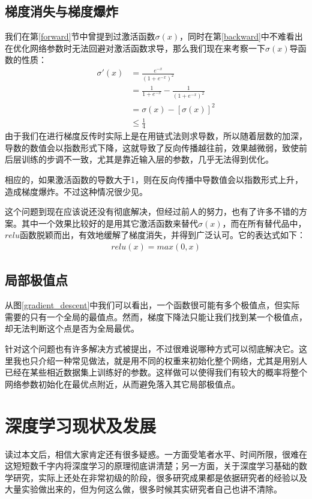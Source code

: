 \documentclass[UTF8,a4paper]{ctexart}
\begin{document}
\begin{multicols}{2}
		\subsection{梯度消失与梯度爆炸}
		\indent 我们在第\ref{forward}节中曾提到过激活函数$\sigma(x)$，同时在第\ref{backward}中不难看出在优化网络参数时无法回避对激活函数求导，那么我们现在来考察一下$\sigma(x)$导函数的性质：	
		\begin{equation}
		\begin{split}
		\sigma'(x) &= \frac{e^{-x}}{(1+e^{-x})^2} \\
		&= \frac{1}{1+e^{-x}} - \frac{1}{(1+e^{-x})^2} \\
		&= \sigma(x) - [\sigma(x)]^2 \\
		&\leq \frac{1}{4}
		\end{split} 
		\end{equation}		
		\indent 由于我们在进行梯度反传时实际上是在用链式法则求导数，所以随着层数的加深，导数的数值会以指数形式下降，这就导致了反向传播越往前，效果越微弱，致使前后层训练的步调不一致，尤其是靠近输入层的参数，几乎无法得到优化。
		
		\indent 相应的，如果激活函数的导数大于1，则在反向传播中导数值会以指数形式上升，造成梯度爆炸。不过这种情况很少见。
		
		\indent 这个问题到现在应该说还没有彻底解决，但经过前人的努力，也有了许多不错的方案。其中一个效果比较好的是用其它激活函数来替代$\sigma(x)$，而在所有替代品中，$relu$函数脱颖而出，有效地缓解了梯度消失，并得到广泛认可。它的表达式如下：	
		\begin{equation}
			\begin{split}
				relu(x) = max(0, x)
			\end{split}	
		\end{equation}
		
		\subsection{局部极值点}
		\indent 从图\ref{gradient_descent}中我们可以看出，一个函数很可能有多个极值点，但实际需要的只有一个全局的最值点。然而，梯度下降法只能让我们找到某一个极值点，却无法判断这个点是否为全局最优。
		
		\indent 针对这个问题也有许多解决方式被提出，不过很难说哪种方式可以彻底解决它。这里我也只介绍一种常见做法，就是用不同的权重来初始化整个网络，尤其是用别人已经在某些相近数据集上训练好的参数。这样做可以使得我们有较大的概率将整个网络参数初始化在最优点附近，从而避免落入其它局部极值点。
		
		
		\section{深度学习现状及发展}
		\indent 读过本文后，相信大家肯定还有很多疑惑。一方面受笔者水平、时间所限，很难在这短短数千字内将深度学习的原理彻底讲清楚；另一方面，关于深度学习基础的数学研究，实际上还处在非常初级的阶段，很多研究成果都是依据研究者的经验以及大量实验做出来的，但为何这么做，很多时候其实研究者自己也讲不清除。
		

\end{multicols}
\end{document}
